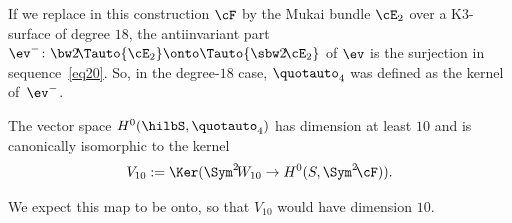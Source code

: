 \begin{rema}\label{analogieD18}
If we replace in this construction $\cF$ by the Mukai bundle $\cE_2$ over a K3-surface of
degree $18$, the antiinvariant part
$
\ev^-\colon \bw2\! \Tauto{\cE_2} \onto \Tauto{\sbw2{\!\cE_2}}
$ of $\ev$ is the surjection in sequence~\eqref{eq20}. So, in the
degree-$18$ case, $\quotauto_4$ was defined as the kernel of~$\ev^-$.
\end{rema}

\begin{lemm}
The vector space $H^0(\hilbS, \quotauto_4)$ has dimension {at least} $10$ and is canonically isomorphic to the kernel
\[
V_{10} := \Ker ( \Sym^2\!W_{10} \to H^0(S,\Sym^2\!\cF )).
\]
\end{lemm}

{We expect this map to be onto, so that $ V_{10}$ would have dimension $10$}.

